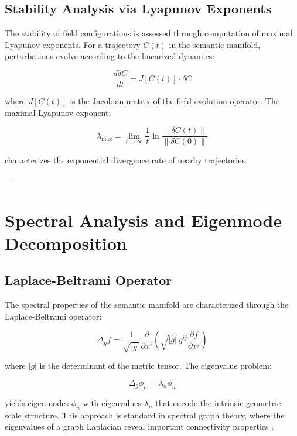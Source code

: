 \subsection{Stability Analysis via Lyapunov Exponents}

The stability of field configurations is assessed through computation of maximal Lyapunov exponents. For a trajectory $C(t)$ in the semantic manifold, perturbations evolve according to the linearized dynamics:

\begin{equation}
\frac{d\delta C}{dt} = J[C(t)] \cdot \delta C
\end{equation}

where $J[C(t)]$ is the Jacobian matrix of the field evolution operator. The maximal Lyapunov exponent:

\begin{equation}
\lambda_{\max} = \lim_{t \to \infty} \frac{1}{t} \ln \frac{\|\delta C(t)\|}{\|\delta C(0)\|}
\end{equation}

characterizes the exponential divergence rate of nearby trajectories.

---

\section{Spectral Analysis and Eigenmode Decomposition}

\subsection{Laplace-Beltrami Operator}

The spectral properties of the semantic manifold are characterized through the Laplace-Beltrami operator:

\begin{equation}
\Delta_g f = \frac{1}{\sqrt{|g|}} \frac{\partial}{\partial x^i} \left(\sqrt{|g|} \, g^{ij} \frac{\partial f}{\partial x^j}\right)
\end{equation}

where $|g|$ is the determinant of the metric tensor. The eigenvalue problem:

\begin{equation}
\Delta_g \phi_n = \lambda_n \phi_n
\end{equation}

yields eigenmodes $\phi_n$ with eigenvalues $\lambda_n$ that encode the intrinsic geometric scale structure. This approach is standard in spectral graph theory, where the eigenvalues of a graph Laplacian reveal important connectivity properties \autocite{Chung1997}.

